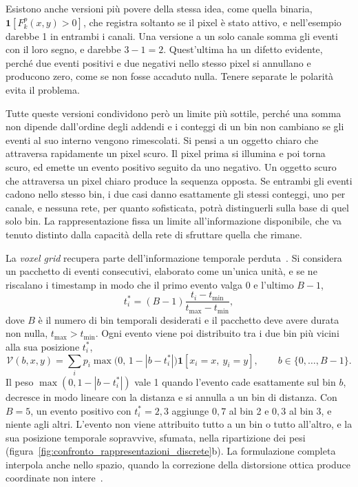 Esistono anche versioni più povere della stessa idea, come quella binaria, $\mathbf 1[F_k^p(x,y)>0]$, che registra soltanto se il pixel è stato attivo, e nell'esempio darebbe 1 in entrambi i canali. Una versione a un solo canale somma gli eventi con il loro segno, e darebbe $3-1=2$. Quest'ultima ha un difetto evidente, perché due eventi positivi e due negativi nello stesso pixel si annullano e producono zero, come se non fosse accaduto nulla. Tenere separate le polarità evita il problema.

Tutte queste versioni condividono però un limite più sottile, perché una somma non dipende dall'ordine degli addendi e i conteggi di un bin non cambiano se gli eventi al suo interno vengono rimescolati. Si pensi a un oggetto chiaro che attraversa rapidamente un pixel scuro. Il pixel prima si illumina e poi torna scuro, ed emette un evento positivo seguito da uno negativo. Un oggetto scuro che attraversa un pixel chiaro produce la sequenza opposta. Se entrambi gli eventi cadono nello stesso bin, i due casi danno esattamente gli stessi conteggi, uno per canale, e nessuna rete, per quanto sofisticata, potrà distinguerli sulla base di quel solo bin. La rappresentazione fissa un limite all'informazione disponibile, che va tenuto distinto dalla capacità della rete di sfruttare quella che rimane.

La \emph{voxel grid} recupera parte dell'informazione temporale perduta~\cite{zhu2019unsupervised}. Si considera un pacchetto di eventi consecutivi, elaborato come un'unica unità, e se ne riscalano i timestamp in modo che il primo evento valga 0 e l'ultimo $B-1$,
\begin{equation}
\label{eq:timestamp_normalizzato}
t_i^*=(B-1)\frac{t_i-t_{\min}}{t_{\max}-t_{\min}},
\end{equation}
dove $B$ è il numero di bin temporali desiderati e il pacchetto deve avere durata non nulla, $t_{\max}>t_{\min}$. Ogni evento viene poi distribuito tra i due bin più vicini alla sua posizione $t_i^*$,
\begin{equation}
\label{eq:voxel_grid_interpolazione}
\mathcal V(b,x,y)=\sum_i p_i
\max\bigl(0,\,1-|b-t_i^*|\bigr)
\mathbf 1[x_i=x,\ y_i=y],
\qquad b\in\{0,\ldots,B-1\}.
\end{equation}
Il peso $\max(0, 1-|b-t_i^*|)$ vale 1 quando l'evento cade esattamente sul bin $b$, decresce in modo lineare con la distanza e si annulla a un bin di distanza. Con $B=5$, un evento positivo con $t_i^*=2{,}3$ aggiunge $0{,}7$ al bin 2 e $0{,}3$ al bin 3, e niente agli altri. L'evento non viene attribuito tutto a un bin o tutto all'altro, e la sua posizione temporale sopravvive, sfumata, nella ripartizione dei pesi (figura~\ref{fig:confronto_rappresentazioni_discrete}b). La formulazione completa interpola anche nello spazio, quando la correzione della distorsione ottica produce coordinate non intere~\cite{zhu2019unsupervised}.

